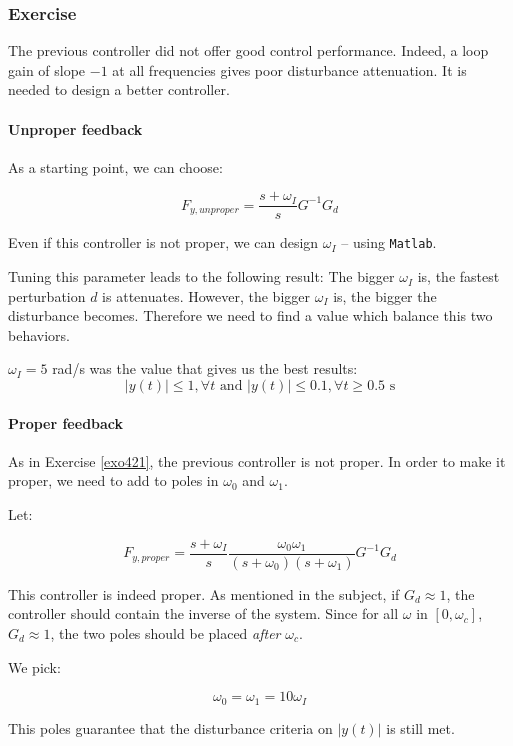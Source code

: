 \subsubsection{Exercise}

The previous controller did not offer good control performance.
Indeed, a loop gain of slope $-1$ at all frequencies gives poor disturbance attenuation. 
It is needed to design a better controller.

\paragraph{Unproper feedback}

As a starting point, we can choose:

$$ F_{y,unproper} = \frac{s + \omega_I}{s} G^{-1} G_d $$

Even if this controller is not proper, we can design $\omega_I$ -- using \texttt{Matlab}. 

Tuning this parameter leads to the following result:
The bigger $\omega_I$ is, the fastest perturbation $d$ is attenuates. 
However, the bigger $\omega_I$ is, the bigger the disturbance becomes.
Therefore we need to find a value which balance this two behaviors.

$\omega_I = 5$ rad/s was the value that gives us the best results: 
        $$|y(t)| \leq 1, \forall t \text{ and } |y(t)| \leq 0.1, \forall t \geq 0.5\text{ s}$$ 

\paragraph{Proper feedback}

As in Exercise \ref{exo421}, the previous controller is not proper.
In order to make it proper, we need to add to poles in $\omega_0$ and $\omega_1$.

Let:

$$ F_{y,proper} = \frac{s + \omega_I}{s} \frac{\omega_0 \omega_1}{(s+ \omega_0)(s + \omega_1)} G^{-1} G_d$$ 

This controller is indeed proper.
As mentioned in the subject, if $G_d \approx 1$, the controller should contain the inverse of the system. 
Since for all $\omega$ in $[0,\omega_c]$, $ G_d \approx 1$, the two poles should be placed \emph{after} $\omega_c$.

We pick:

$$\omega_0 = \omega_1 = 10\omega_I$$

This poles guarantee that the disturbance criteria on $|y(t)|$ is still met.

